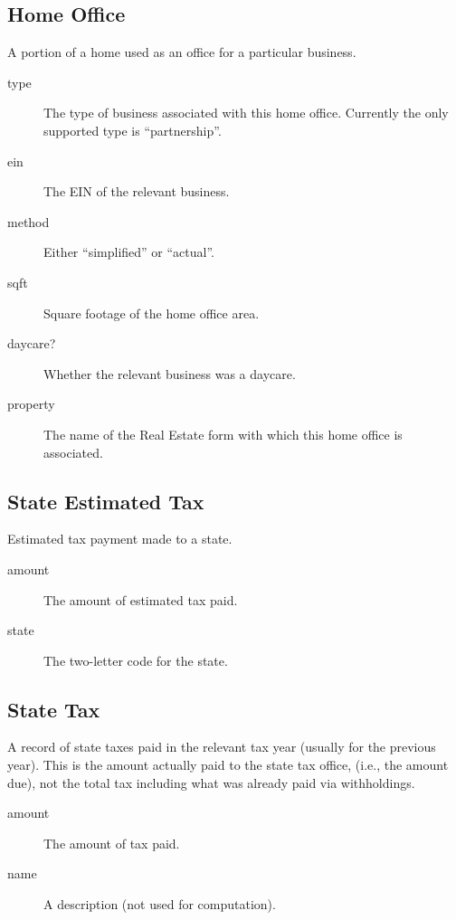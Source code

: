 \documentclass[12pt]{article}
\begin{document}
\subsection{Home Office}

A portion of a home used as an office for a particular business.

\begin{description}
\item[type] The type of business associated with this home office. Currently the
only supported type is ``partnership''.
\item[ein] The EIN of the relevant business.
\item[method] Either ``simplified'' or ``actual''.
\item[sqft] Square footage of the home office area.
\item[daycare?] Whether the relevant business was a daycare.
\item[property] The name of the Real Estate form with which this home office is
associated.
\end{description}

\subsection{State Estimated Tax}

Estimated tax payment made to a state.

\begin{description}
\item[amount] The amount of estimated tax paid.
\item[state] The two-letter code for the state.
\end{description}




\subsection{State Tax}

A record of state taxes paid in the relevant tax year (usually for the previous
year). This is the amount actually paid to the state tax office, (i.e., the
amount due), not the total tax including what was already paid via withholdings.

\begin{description}
\item[amount] The amount of tax paid.
\item[name] A description (not used for computation).
\end{description}
\end{document}
